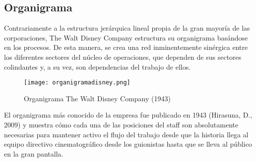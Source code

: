 \subsection{Organigrama}

Contrariamente a la estructura jerárquica lineal propia de la gran mayoría de las corporaciones, The Walt Disney Company estructura su organigrama basándose en los procesos. De esta manera, se crea una red inminentemente sinérgica entre los diferentes sectores del núcleo de operaciones, que dependen de sus sectores colindantes y, a su vez, son dependencias del trabajo de ellos.

\begin{figure}[!htb]
\centering
\texttt{[image: organigramadisney.png]}
\caption{\label{fig:frog}Organigrama The Walt Disney Company (1943)}
\end{figure}

El organigrama más conocido de la empresa fue publicado en 1943 (Hirasuna, D., 2009) y muestra cómo cada una de las posiciones del staff son absolutamente necesarias para mantener activo el flujo del trabajo desde que la historia llega al equipo directivo cinematográfico desde los guionistas hasta que se lleva al público en la gran pantalla.
